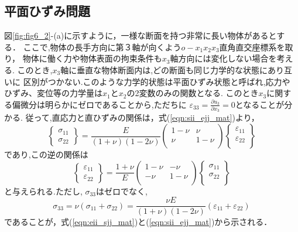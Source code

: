 \documentclass[10pt,a4j]{jbook}
\begin{document}
\subsection{平面ひずみ問題}
図\ref{fig:fig6_2}-(a)に示すように，一様な断面を持つ非常に長い物体があるとする．
ここで,物体の長手方向に第３軸が向くよう$o-x_1x_2x_3$直角直交座標系を取り，
物体に働く力や物体表面の拘束条件も$x_3$軸方向には変化しない場合を考える.
このとき,$x_3$軸に垂直な物体断面内は,どの断面も同じ力学的な状態にあり互いに
区別がつかない.このような力学的状態は平面ひずみ状態と呼ばれ,応力や
ひずみ、変位等の力学量は$x_1$と$x_2$の2変数のみの関数となる.
このとき$x_3$に関する偏微分は明らかにゼロであることから,ただちに
$\varepsilon_{33}=\frac{\partial u_3}{\partial x_3}=0$となることが分かる.
従って,直応力と直ひずみの関係は，式(\ref{eqn:sii_ejj_mat})より，
\begin{equation}
	\left\{ 
	\begin{array}{*{20}{c}}
		\sigma _{11}\\
		\sigma _{22}
	\end{array} 
	\right\} 
	= 
	\frac{E}{\left( 1 + \nu  \right)\left( 1 - 2\nu  \right)}
	\left( 
		\begin{array}{*{20}{c}}
		1 - \nu & \nu \\
		\nu & 1 - \nu \\
		\end{array}
	\right)
	\left\{ 
		\begin{array}{*{20}{c}}
		\varepsilon _{11}\\
		\varepsilon _{22}\\
		\end{array}
	\right\}
	\label{eqn:Hooke_pstrain}
\end{equation}
であり,この逆の関係は
\begin{equation}
	\left\{ 
	\begin{array}{*{20}{c}}
		\varepsilon _{11}\\
		\varepsilon_{22}
	\end{array} 
	\right\} 
	= 
	\frac{1+\nu}{E}
	\left( 
		\begin{array}{*{20}{c}}
		1 - \nu & -\nu \\
		-\nu & 1 - \nu \\
		\end{array}
	\right)
	\left\{ 
		\begin{array}{*{20}{c}}
		\sigma_{11}\\
		\sigma_{22}\\
		\end{array}
	\right\}
	\label{eqn:Hooke_pstrain}
\end{equation}
と与えられる.ただし, $\sigma_{33}$はゼロでなく,
\begin{equation}
	\sigma_{33}
	=\nu \left(\sigma_{11}+\sigma_{22}\right)
	=\frac{\nu E}{(1+\nu)(1-2\nu)}\left(\varepsilon_{11}+\varepsilon_{22}\right)
	\label{eqn:s33_pstrain}
\end{equation}
であることが，式(\ref{eqn:eii_sjj_mat})と(\ref{eqn:sii_ejj_mat})から示される．
\end{document}

